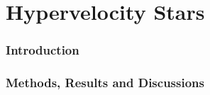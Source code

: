 \documentclass[a4paper]{article}
\begin{document}
	
	\setcounter{section}{0}
	\part{Hypervelocity Stars} \label{Problem3}


		\section{Introduction} \label{3:introduction}

		
		\section{Methods, Results and Discussions}
		
\end{document}
